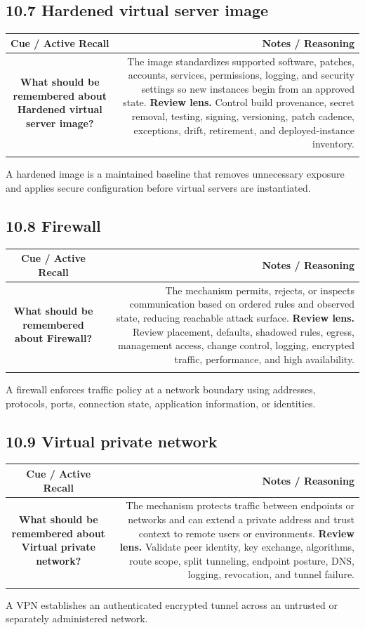 \documentclass[11pt]{article}
\newcommand{\CornellHeader}{\rowcolor{Navy}\color{white}\bfseries Cue / Active Recall & \color{white}\bfseries Notes / Reasoning \\\endhead}
\newcommand{\CornellRow}[2]{\cellcolor{CueGray}\textbf{#1} & #2 \\\addlinespace[3pt]}
\begin{document}
\subsection{10.7 Hardened virtual server image}
\begin{longtable}{@{}C N@{}}
\CornellHeader
\CornellRow{What should be remembered about Hardened virtual server image?}{The image standardizes supported software, patches, accounts, services, permissions, logging, and security settings so new instances begin from an approved state. \textbf{Review lens.} Control build provenance, secret removal, testing, signing, versioning, patch cadence, exceptions, drift, retirement, and deployed-instance inventory.}
\end{longtable}
\begin{sectionsummarybox}
A hardened image is a maintained baseline that removes unnecessary exposure and applies secure configuration before virtual servers are instantiated.
\end{sectionsummarybox}
\subsection{10.8 Firewall}
\begin{longtable}{@{}C N@{}}
\CornellHeader
\CornellRow{What should be remembered about Firewall?}{The mechanism permits, rejects, or inspects communication based on ordered rules and observed state, reducing reachable attack surface. \textbf{Review lens.} Review placement, defaults, shadowed rules, egress, management access, change control, logging, encrypted traffic, performance, and high availability.}
\end{longtable}
\begin{sectionsummarybox}
A firewall enforces traffic policy at a network boundary using addresses, protocols, ports, connection state, application information, or identities.
\end{sectionsummarybox}
\subsection{10.9 Virtual private network}
\begin{longtable}{@{}C N@{}}
\CornellHeader
\CornellRow{What should be remembered about Virtual private network?}{The mechanism protects traffic between endpoints or networks and can extend a private address and trust context to remote users or environments. \textbf{Review lens.} Validate peer identity, key exchange, algorithms, route scope, split tunneling, endpoint posture, DNS, logging, revocation, and tunnel failure.}
\end{longtable}
\begin{sectionsummarybox}
A VPN establishes an authenticated encrypted tunnel across an untrusted or separately administered network.
\end{sectionsummarybox}
\end{document}

